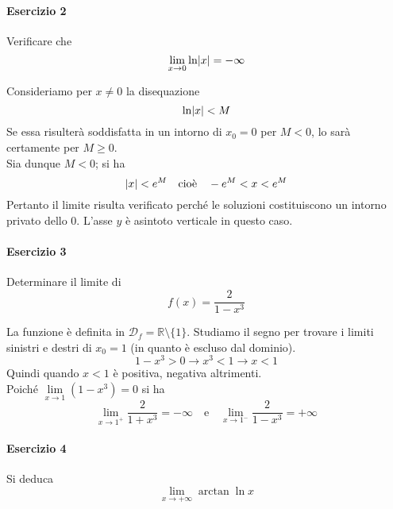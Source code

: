 \paragraph{Esercizio 2}
Verificare che
\begin{equation*}
  \lim\limits_{x\to0}\ln\lvert x\rvert=-\infty
\end{equation*}
\divisor

Consideriamo per $x\neq0$ la disequazione
\begin{equation*}
  \ln\lvert x\rvert<M
\end{equation*}
Se essa risulterà soddisfatta in un intorno di $x_0=0$ per $M<0$, lo sarà certamente per $M\geq0$.\\
Sia dunque $M<0$; si ha
\begin{equation*}
  \lvert x\rvert<e^M\quad\text{cioè}\quad-e^M<x<e^M
\end{equation*}
Pertanto il limite risulta verificato perché le soluzioni costituiscono un intorno privato dello $0$.
L'asse $y$ è asintoto verticale in questo caso.

\paragraph{Esercizio 3}
Determinare il limite di
\begin{equation*}
  f(x)=\frac{2}{1-x^3}
\end{equation*}
\divisor

La funzione è definita in $\mathscr{D}_f=\mathbb{R}\setminus\{1\}$. Studiamo il segno per trovare
i limiti sinistri e destri di $x_0=1$ (in quanto è escluso dal dominio).
\begin{equation*}
  1-x^3>0\rightarrow x^3<1\rightarrow x<1
\end{equation*}
Quindi quando $x<1$ è positiva, negativa altrimenti.\\
Poiché $\lim\limits_{x\to1}(1-x^3)=0$ si ha
\begin{equation*}
  \boxed{\lim\limits_{x\to1^+}\frac{2}{1+x^3}=-\infty}\quad\text{e}\quad
  \boxed{\lim\limits_{x\to1^-}\frac{2}{1-x^3}=+\infty}
\end{equation*}

\paragraph{Esercizio 4}
Si deduca
\begin{equation*}
  \lim\limits_{x\to+\infty}\arctan\ln x
\end{equation*}
\divisor

